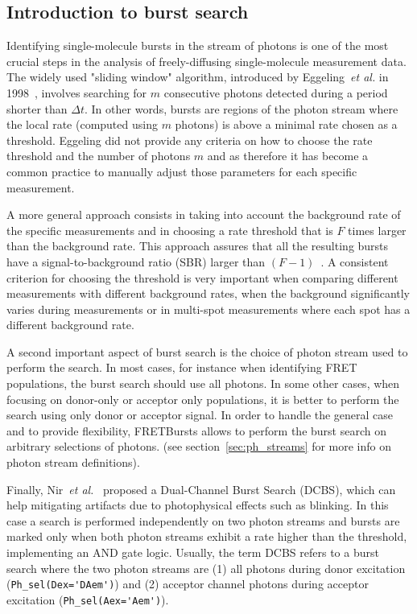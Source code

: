 \subsection{Introduction to burst search}
\label{sec:burstsearch_intro}

Identifying single-molecule bursts in the stream of photons is
one of the most crucial steps in the analysis of freely-diffusing single-molecule measurement data.
The widely used "sliding window" algorithm, introduced by
Eggeling~\textit{et al.} in 1998~\cite{Eggeling_1998}, involves searching for
$m$ consecutive photons detected during a period shorter than
$\Delta t$. In other words, bursts are regions of the photon stream where the
local rate (computed using $m$ photons) is above a minimal rate chosen as a
threshold. Eggeling did not provide any criteria on how to choose the rate
threshold and the number of photons $m$ and as therefore it has become a common
practice to manually adjust those parameters for each specific measurement.

A more general approach consists in taking into account the background rate of
the specific measurements and in choosing a rate threshold that is $F$ times
larger than the background rate. This approach assures that all the resulting bursts
have a signal-to-background ratio (SBR) larger than
$(F-1)$~\cite{Michalet_2012}. A consistent criterion for choosing the threshold is
very important when comparing different measurements with different background
rates, when the background significantly varies during measurements or in
multi-spot measurements where each spot has a different background rate.

A second important aspect of burst search is the choice of photon stream used
to perform the search.
In most cases, for instance when identifying FRET populations,
the burst search should use all photons. In some other cases, when focusing on
donor-only or acceptor only populations, it is better to perform the search using
only donor or acceptor signal.
In order to handle the general case and to provide flexibility,
FRETBursts allows to perform the burst search on arbitrary selections of photons.
(see section~\ref{sec:ph_streams} for more info on photon stream definitions).

Finally, Nir~\textit{et al.}~\cite{Nir_2006} proposed a Dual-Channel Burst
Search (DCBS), which can help mitigating artifacts due to
photophysical effects such as blinking. In this case a search is performed
independently on two photon streams and bursts are marked only when both photon
streams exhibit a rate higher than the threshold,
implementing an AND gate logic.
Usually, the term DCBS refers to a burst search where the two photon streams
are (1) all photons
during donor excitation (\verb|Ph_sel(Dex='DAem')|) and (2) acceptor channel photons
during acceptor
excitation (\verb|Ph_sel(Aex='Aem')|).

